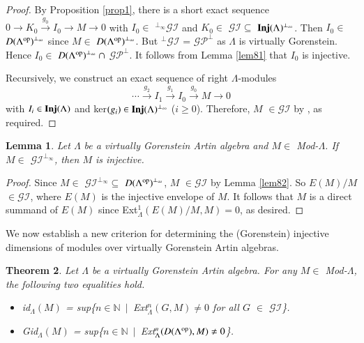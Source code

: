 \documentclass[11pt,a4paper]{article}
\newtheorem{thm}{Theorem}[section]
\newtheorem{lem}[thm]{Lemma}
\begin{document}
\begin{proof} By Proposition \ref{prop1}, there is a short exact sequence
$0\rightarrow  K_{0}    \stackrel {g_{0}}\longrightarrow I_{0} \rightarrow  M\rightarrow 0   $ with  $I_{0} \in $    $^{\perp_{\infty}}{\mathscr{GI}}$   and   $ K_{0} \in $  $\mathscr{GI} \subseteq$ ${\bf Inj}(\Lambda)^{\perp_{\infty}}$.
Then $I_{0} \in $ ${D(\Lambda^{{\rm op}})}^{\perp_{\infty}} $ since $M \in $ ${D(\Lambda^{{\rm op}})}^{\perp_{\infty}} $.
But $^{\perp}{\mathscr{GI}}$ = $\mathscr{GP}^\perp$ as $\Lambda$ is virtually
Gorenstein. Hence  $I_{0} \in $ ${D(\Lambda^{{\rm op}})}^{\perp_{\infty}}\ \cap $ $\mathscr{GP}^\perp$.
It follows from  Lemma  \ref{lem81} that $I_{0}   $ is injective.

Recursively, we construct an exact sequence of right $\Lambda$-modules
$$ \cdots \stackrel {g_{2}} \longrightarrow
I_1\stackrel {g_{1}} \longrightarrow I_0\stackrel {g_{0}}
\longrightarrow M  \longrightarrow  0  $$
with $I_i \in {\bf Inj}(\Lambda)$ and ker$(g_i) \in {\bf Inj}(\Lambda)^{\perp_{\infty}}$ ($i \geq 0$).
Therefore, $M $   $\in \mathscr{GI}$ by \cite[Lemma 17(2)]{gii}, as required. \end{proof}

\begin{lem}\label{lem83}   Let    $\Lambda$ be a virtually
Gorenstein Artin algebra and   $M\in $  {\rm Mod}-$\Lambda$. If   $M \in $ ${\mathscr{GI}}^{\perp_{\infty}} $,
  then $M $   is injective.\end{lem}

\begin{proof} Since $M \in $ ${\mathscr{GI}}^{\perp_{\infty}} \subseteq$ ${D(\Lambda^{{\rm op}})}^{\perp_{\infty}} $,
  $M $   $\in \mathscr{GI}$ by Lemma \ref{lem82}.
So  $E(M)/M  $ $\in \mathscr{GI}$, where  $E(M)$ is the injective envelope of $M $.
 It follows that $M $ is a direct summand of $E(M)$ since  Ext$_{\Lambda}^{1}(E(M)/M, M) =  0$,  as desired. \end{proof}

We now establish a new criterion for determining the (Gorenstein) injective dimensions of   modules over virtually
Gorenstein Artin algebras.

 \begin{thm}\label{thm91}   Let    $\Lambda$ be a virtually
Gorenstein Artin algebra.  For any   $M\in $  {\rm Mod}-$\Lambda$, the following  two equalities hold.
 \begin{itemize}
\item[$(1)$]  {\rm  id$_{\Lambda}$$(M)$ =  sup\{$n \in \mathbb{N}$\ $|$\   Ext$_{\Lambda}^{n}(G, M) \neq  0$ for all $G $   $\in $  $\mathscr{GI}$\}.}
\item[$(2)$] {\rm  Gid$_{\Lambda}$$(M)$ =  sup\{$n \in \mathbb{N}$\ $|$\   Ext$_{\Lambda}^{n}(D(\Lambda^{{\rm op}}), M) \neq  0$\}.}
\end{itemize}    \end{thm}
\end{document}
